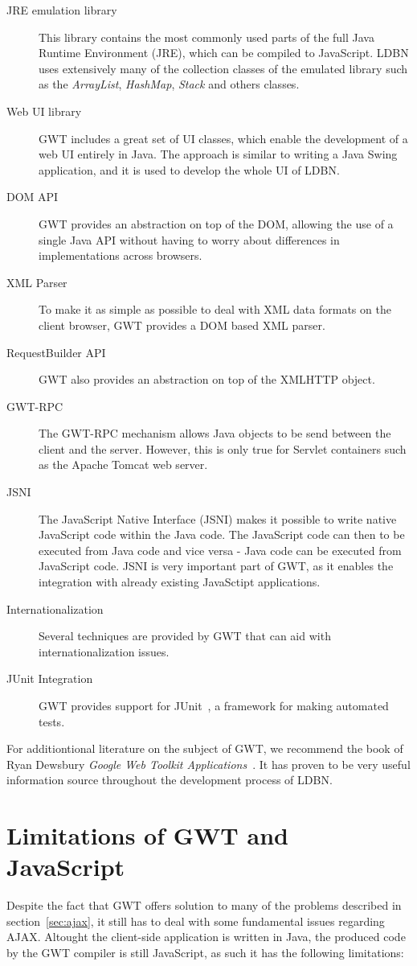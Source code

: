 \begin{description}
	\item[JRE emulation library] This library contains 
	the most commonly used parts of the full Java Runtime Environment (JRE), 
	which can be compiled to JavaScript. LDBN uses extensively many of the collection 
	classes of the emulated library such as the \textit{ArrayList}, \textit{HashMap}, 
	\textit{Stack} and others classes.
	\item[Web UI library] GWT includes a great set of UI classes, which 
	enable the development of a web UI entirely in Java. The approach is similar 
	to writing a Java Swing application, and it is used to develop the whole UI 
	of LDBN. 
	\item[DOM API] GWT provides an abstraction on top of the DOM, 
	allowing the use of a single Java API without having to worry about 
	differences in implementations across browsers.
	\item[XML Parser] To make it as simple as possible to deal with XML data formats 
	on the client browser, GWT provides a DOM based XML parser.
	\item[RequestBuilder API] GWT also provides an abstraction on top of the
	XMLHTTP object. 
	\item[GWT-RPC] The GWT-RPC mechanism allows Java objects to be send between 
	the client and the server. However, this is only true for 
	Servlet containers such as the Apache Tomcat web server. 
	\item[JSNI] The JavaScript Native Interface (JSNI) makes it possible to
	write native JavaScript code within the Java code. The JavaScript code can 
	then to be executed from Java code and vice versa - Java code can be executed
	from JavaScript code. JSNI is very important part of GWT, as it enables 
	the integration with already existing JavaSctipt applications.  
	\item[Internationalization] Several techniques are provided by GWT that can 
	aid with internationalization issues.
	\item[JUnit Integration] GWT provides support for JUnit~\cite{wjunit}, 
	a framework for making automated tests.
\end{description}

For additiontional literature on the subject of GWT, we recommend the book of 
Ryan Dewsbury \textit{Google Web Toolkit Applications}~\cite{bgwt2}. It has
proven to be very useful information source throughout the development process 
of LDBN.  

\section{Limitations of GWT and JavaScript}
Despite the fact that GWT offers solution to many of the problems
described in section~\ref{sec:ajax}, it still has to deal with some 
fundamental issues regarding 
AJAX. Altought the client-side application is written in Java, 
the produced code by the GWT compiler is still JavaScript, 
as such it has the following limitations:
   
